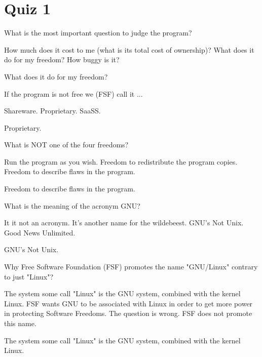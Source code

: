 \section{Quiz 1}
\begin{question}[type=exam]
What is the most important question to judge the program?
\begin{itemize}
\chk How much does it cost to me (what is its total cost of ownership)?
\chk What does it do for my freedom?
\chk How buggy is it?
\end{itemize}
\end{question}
\begin{solution}
What does it do for my freedom?
\end{solution}

\begin{question}[type=exam]
If the program is not free we (FSF) call it ...
\begin{itemize}
\chk  Shareware.
\chk Proprietary.
\chk SaaSS.
\end{itemize}
\end{question}
\begin{solution}
Proprietary.
\end{solution}

\begin{question}[type=exam]
What is NOT one of the four freedoms?
\begin{itemize}
\chk Run the program as you wish.
\chk Freedom to redistribute the program copies.
\chk Freedom to describe flaws in the program.
\end{itemize}
\end{question}
\begin{solution}
Freedom to describe flaws in the program.
\end{solution}

\begin{question}[type=exam]
What is the meaning of the acronym GNU?
\begin{itemize}
\chk It it not an acronym. It's another name for the wildebeest.
\chk GNU's Not Unix.
\chk Good News Unlimited.
\end{itemize}
\end{question}
\begin{solution}
GNU's Not Unix.
\end{solution}

\begin{question}[type=exam]
Why Free Software Foundation (FSF) promotes the name "GNU/Linux" contrary to just "Linux"?
\begin{itemize}
\chk The system some call "Linux" is the GNU system, combined with the kernel Linux.
\chk FSF wants GNU to be associated with Linux in order to get more power in protecting Software Freedoms.
\chk The question is wrong. FSF does not promote this name.
\end{itemize}
\end{question}
\begin{solution}
The system some call "Linux" is the GNU system, combined with the kernel Linux.
\end{solution}

